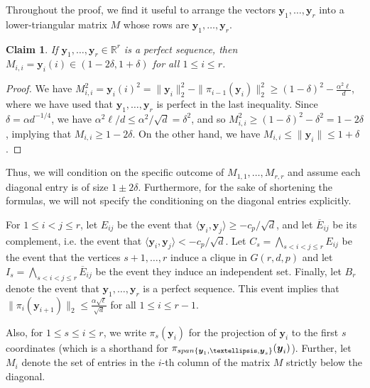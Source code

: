 \documentclass[10pt,a4paper]{amsart}
\newtheorem{claim}{Claim}
\def\by{\boldsymbol{y}}
\def\bR{\mathbb{R}}
\begin{document}
Throughout the proof, we find it useful to arrange the vectors $\by_1, \dots, \by_r$ into a lower-triangular matrix $M$ whose rows are $\by_1, \dots, \by_r$.

\begin{claim}\label{claim:diagonal_bound}
If $\by_1, \dots, \by_r\in \bR^r$ is a perfect sequence, then $M_{i, i}=\by_i(i)\in (1-2\delta, 1+\delta)$ for all $1\leq i\leq r$.
\end{claim}
\begin{proof}
We have $M_{i, i}^2=\by_i(i)^2=\|\by_i\|_2^2-\|\pi_{i-1}(\by_i)\|_2^2\geq (1-\delta)^2-\frac{\alpha^2\ell}{d}$, where we have used that $\by_1, \dots, \by_r$ is perfect in the last inequality. Since $\delta=\alpha d^{-1/4}$, we have $\alpha^2\ell/d\leq \alpha^2/\sqrt{d}=\delta^2$, and so $M_{i, i}^2\geq (1-\delta)^2-\delta^2=1-2\delta$, implying that $M_{i, i}\geq 1-2\delta$. On the other hand, we have $M_{i, i}\leq \|\by_i\|\leq 1+\delta$.
\end{proof}

Thus, we will condition on the specific outcome of $M_{1, 1}, \dots, M_{r, r}$ and assume each diagonal entry is of size $1\pm 2\delta$. Furthermore, for the sake of shortening the formulas, we will not specify the conditioning on the diagonal entries explicitly.

For $1\leq i<j\leq r$, let $E_{ij}$ be the event that $\langle \by_i, \by_j\rangle\geq -c_p/\sqrt{d}$, and let $\overline{E}_{ij}$ be its complement, i.e. the event that $\langle \by_i, \by_j\rangle< -c_p/\sqrt{d}$. Let $C_s=\bigwedge_{s< i<j\leq r} E_{ij}$ be the event that the vertices $s+1, \dots, r$ induce a clique in $G(r, d, p)$ and let $I_s=\bigwedge_{s< i<j\leq r} \overline{E}_{ij}$ be the event they induce an independent set. Finally, let $B_r$ denote the event that $\by_1, \dots, \by_r$ is a perfect sequence. This event implies that $\|\pi_i(\by_{i+1})\|_2\leq \frac{\alpha\sqrt{\ell}}{\sqrt{d}}$ for all $1\leq i\leq r-1$.

Also, for $1\leq s\leq i\leq r$, we write $\pi_s(\by_i)$ for the projection of $\by_i$ to the first $s$ coordinates (which is a shorthand for $\pi_{{\rm span}\{\by_1, \dots, \by_s\}}(\by_i)$). Further, let $M_i$ denote the set of entries in the $i$-th column of the matrix $M$ strictly below the diagonal.
\end{document}
